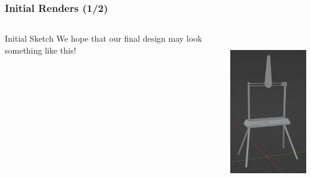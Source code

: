 \documentclass[aspectratio=169]{beamer}
\begin{document}
\begin{frame}
    \frametitle{Initial Renders (1/2)}

    \begin{columns}                         %
        \begin{column}{0.48\textwidth}
            \begin{block}{Initial Sketch}
                We hope that our final design may look something like this!
            \end{block}
        \end{column}
        \begin{column}{0.48\textwidth}
            \includegraphics[height=7cm]{Full}
        \end{column}
    \end{columns}

\end{frame}
\end{document}
